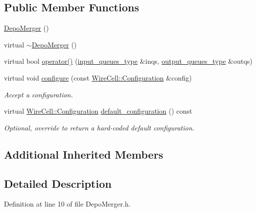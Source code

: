 \subsection*{Public Member Functions}
\begin{DoxyCompactItemize}
\item 
\hyperlink{class_wire_cell_1_1_gen_1_1_depo_merger_a2a522e3d8b5c799f428f12c8b1ccd573}{Depo\+Merger} ()
\item 
virtual \hyperlink{class_wire_cell_1_1_gen_1_1_depo_merger_ad244eb579b12ad710bdcfbbe04c4fb91}{$\sim$\+Depo\+Merger} ()
\item 
virtual bool \hyperlink{class_wire_cell_1_1_gen_1_1_depo_merger_a5130fcd168e7d749e2ee02add469fae3}{operator()} (\hyperlink{class_wire_cell_1_1_i_hydra_node_ada2ba4a3ba2716c9838ae039e475d683}{input\+\_\+queues\+\_\+type} \&inqs, \hyperlink{class_wire_cell_1_1_i_hydra_node_aeb800228236a385497609533fc0fe256}{output\+\_\+queues\+\_\+type} \&outqs)
\item 
virtual void \hyperlink{class_wire_cell_1_1_gen_1_1_depo_merger_a8eeb98823bba10b7acc939e691a41691}{configure} (const \hyperlink{namespace_wire_cell_a9f705541fc1d46c608b3d32c182333ee}{Wire\+Cell\+::\+Configuration} \&config)
\begin{DoxyCompactList}\small\item\em Accept a configuration. \end{DoxyCompactList}\item 
virtual \hyperlink{namespace_wire_cell_a9f705541fc1d46c608b3d32c182333ee}{Wire\+Cell\+::\+Configuration} \hyperlink{class_wire_cell_1_1_gen_1_1_depo_merger_aeff369792193398df64bbc9bd90bdbab}{default\+\_\+configuration} () const
\begin{DoxyCompactList}\small\item\em Optional, override to return a hard-\/coded default configuration. \end{DoxyCompactList}\end{DoxyCompactItemize}
\subsection*{Additional Inherited Members}


\subsection{Detailed Description}


Definition at line 10 of file Depo\+Merger.\+h.



